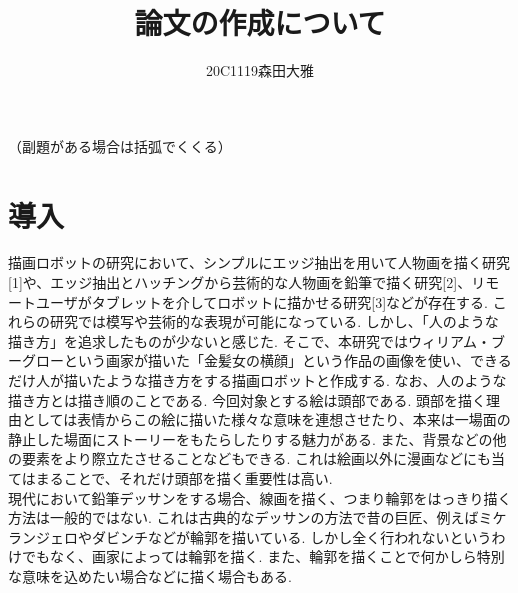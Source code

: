 \documentclass[10pt]{jarticle}
\begin{document}
    
    \makeatletter
    \title{論文の作成について}{（副題がある場合は括弧でくくる）}
    
    \author{20C1119\hspace{.5zw}森田大雅}
    
    \makeatother
    
    
    
    \maketitle
    
    
    \section{導\hspace{2zw}入}%
	描画ロボットの研究において、シンプルにエッジ抽出を用いて人物画を描く研究[1]や、エッジ抽出とハッチングから芸術的な人物画を鉛筆で描く研究[2]、リモートユーザがタブレットを介してロボットに描かせる研究[3]などが存在する.
	これらの研究では模写や芸術的な表現が可能になっている.
	しかし、「人のような描き方」を追求したものが少ないと感じた.
	そこで、本研究ではウィリアム・ブーグローという画家が描いた「金髪女の横顔」という作品の画像を使い、できるだけ人が描いたような描き方をする描画ロボットと作成する.
	なお、人のような描き方とは描き順のことである.
	今回対象とする絵は頭部である.
	頭部を描く理由としては表情からこの絵に描いた様々な意味を連想させたり、本来は一場面の静止した場面にストーリーをもたらしたりする魅力がある.
	また、背景などの他の要素をより際立たさせることなどもできる.
	これは絵画以外に漫画などにも当てはまることで、それだけ頭部を描く重要性は高い.
	\\
	現代において鉛筆デッサンをする場合、線画を描く、つまり輪郭をはっきり描く方法は一般的ではない.
	これは古典的なデッサンの方法で昔の巨匠、例えばミケランジェロやダビンチなどが輪郭を描いている.
	しかし全く行われないというわけでもなく、画家によっては輪郭を描く.
	また、輪郭を描くことで何かしら特別な意味を込めたい場合などに描く場合もある.
	
\end{document}
